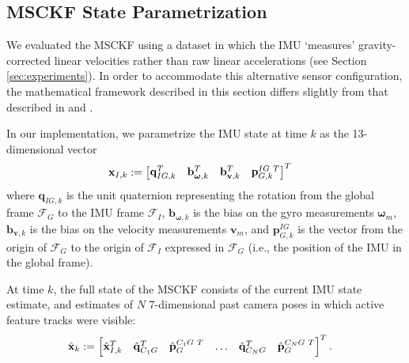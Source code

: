 \documentclass[letterpaper, 10 pt, conference]{ieeeconf}  %
\def\Vec#1{\mathbf{#1}}
\newcommand{\bbm}{\begin{bmatrix}}
\newcommand{\ebm}{\end{bmatrix}}
\begin{document}
\subsection{MSCKF State Parametrization}
We evaluated the MSCKF using a dataset in which the IMU `measures' gravity-corrected linear velocities rather than raw linear accelerations (see Section \ref{sec:experiments}).
In order to accommodate this alternative sensor configuration, the mathematical framework described in this section differs slightly from that described in \cite{Mourikis:2006:TechReport} and \cite{Mourikis:2007:ICRA}.

In our implementation, we parametrize the IMU state at time $k$ as the 13-dimensional vector
\begin{align}
    \Vec{x}_{I,k} &:= \bbm \Vec{q}_{IG,k}^T & \Vec{b}_{\boldsymbol{\omega},k}^T & \Vec{b}_{\Vec{v},k}^T & \Vec{p}_{G,k}^{IG \hspace{0.3em} T} \ebm^T
\end{align}
where $\Vec{q}_{IG,k}$ is the unit quaternion representing the rotation from the global frame $\mathcal{F}_G$ to the IMU frame $\mathcal{F}_I$, $\Vec{b}_{\boldsymbol{\omega},k}$ is the bias on the gyro measurements $\boldsymbol{\omega}_m$, $\Vec{b}_{\Vec{v},k}$ is the bias on the velocity measurements $\Vec{v}_m$, and $\Vec{p}_{G,k}^{IG}$ is the vector from the origin of $\mathcal{F}_G$ to the origin of $\mathcal{F}_I$ expressed in $\mathcal{F}_G$ (i.e., the position of the IMU in the global frame).

At time $k$, the full state of the MSCKF consists of the current IMU state estimate, and estimates of $N$ 7-dimensional past camera poses in which active feature tracks were visible:
\begin{align*}
    \hat{\Vec{x}}_k &:= \bbm \hat{\Vec{x}}_{I,k}^T & \hat{\Vec{q}}_{C_1 G}^T & \hat{\Vec{p}}_G^{C_1 G \hspace{0.3em} T} & \hdots & \hat{\Vec{q}}_{C_N G}^T & \hat{\Vec{p}}_G^{C_N G \hspace{0.3em} T} \ebm ^T.
\end{align*}
\end{document}
